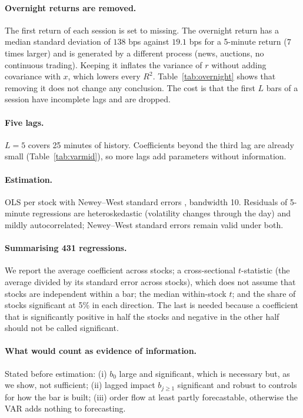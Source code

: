 \documentclass[11pt,a4paper]{article}
\begin{document}
\paragraph{Overnight returns are removed.} The first return of each session is set to missing. The
overnight return has a median standard deviation of $138$ bps against $19.1$ bps for a 5-minute return
($7$ times larger) and is generated by a different process
(news, auctions, no continuous trading). Keeping it inflates the variance of $r$ without adding
covariance with $x$, which lowers every $R^2$. Table~\ref{tab:overnight} shows that removing it does not
change any conclusion. The cost is that the first $L$ bars of a session have incomplete lags and are
dropped.

\paragraph{Five lags.} $L=5$ covers 25 minutes of history. Coefficients beyond the third lag are
already small (Table~\ref{tab:varmid}), so more lags add parameters without information.

\paragraph{Estimation.} OLS per stock with Newey--West standard errors \citep{newey1987}, bandwidth
10. Residuals of 5-minute regressions are heteroskedastic (volatility changes through the day) and
mildly autocorrelated; Newey--West standard errors remain valid under both.

\paragraph{Summarising 431 regressions.} We report the average coefficient across stocks; a
cross-sectional $t$-statistic (the average divided by its standard error across stocks), which does
not assume that stocks are independent within a bar; the median within-stock $t$; and the share of
stocks significant at 5\% in each direction. The last is needed because a coefficient that is
significantly positive in half the stocks and negative in the other half should not be called
significant.

\paragraph{What would count as evidence of information.} Stated before estimation: (i) $b_0$ large
and significant, which is necessary but, as we show, not sufficient; (ii) lagged impact $b_{j\ge1}$
significant and robust to controls for how the bar is built; (iii) order flow at least partly
forecastable, otherwise the VAR adds nothing to forecasting.
\end{document}
